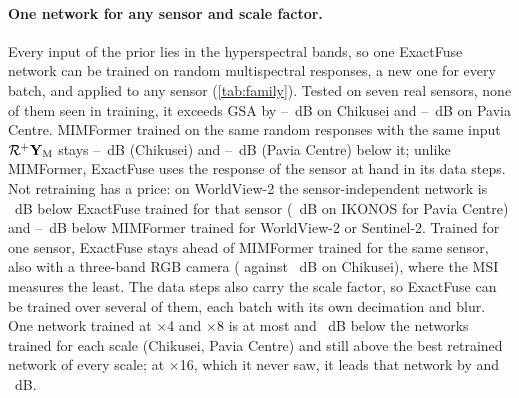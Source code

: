 \documentclass[10pt,twocolumn,letterpaper]{article}
\begin{document}
\paragraph{One network for any sensor and scale factor.} Every input of the prior lies in the hyperspectral bands, so one ExactFuse network can be trained on random multispectral responses, a new one for every batch, and applied to any sensor (\cref{tab:family}). Tested on seven real sensors, none of them seen in training, it exceeds GSA by --~dB on Chikusei and --~dB on Pavia Centre. MIMFormer trained on the same random responses with the same input $\mathcal{R}^{+}\mathbf{Y}_{\mathrm{M}}$ stays --~dB (Chikusei) and --~dB (Pavia Centre) below it; unlike MIMFormer, ExactFuse uses the response of the sensor at hand in its data steps. Not retraining has a price: on WorldView-2 the sensor-independent network is ~dB below ExactFuse trained for that sensor (~dB on IKONOS for Pavia Centre) and --~dB below MIMFormer trained for WorldView-2 or Sentinel-2. Trained for one sensor, ExactFuse stays ahead of MIMFormer trained for the same sensor, also with a three-band RGB camera ( against ~dB on Chikusei), where the MSI measures the least. The data steps also carry the scale factor, so ExactFuse can be trained over several of them, each batch with its own decimation and blur. One network trained at $\times$4 and $\times$8 is at most  and ~dB below the networks trained for each scale (Chikusei, Pavia Centre) and still above the best retrained network of every scale; at $\times$16, which it never saw, it leads that network by  and ~dB.
\end{document}
